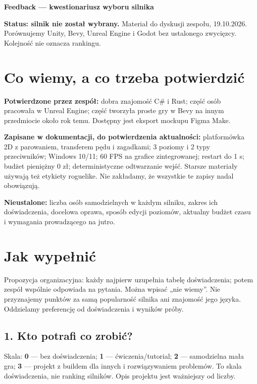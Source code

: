 \documentclass[10pt,a4paper]{article}
\begin{document}
{\Huge\bfseries Feedback — kwestionariusz wyboru silnika\par}\vspace{3mm}


\textbf{Status: silnik nie został wybrany.} Materiał do dyskusji zespołu, 19.10.2026. Porównujemy Unity, Bevy, Unreal Engine i Godot bez ustalonego zwycięzcy. Kolejność nie oznacza rankingu.



\section*{Co wiemy, a co trzeba potwierdzić}


\textbf{Potwierdzone przez zespół:} dobra znajomość C\# i Rust; część osób pracowała w Unreal Engine; część tworzyła proste gry w Bevy na innym przedmiocie około rok temu. Dostępny jest eksport mockupu Figma Make.



\textbf{Zapisane w dokumentacji, do potwierdzenia aktualności:} platformówka 2D z parowaniem, transferem pędu i zagadkami; 3 poziomy i 2 typy przeciwników; Windows 10/11; 60 FPS na grafice zintegrowanej; restart do 1 s; budżet pieniężny 0 zł; deterministyczne odtwarzanie wejść. Starsze materiały używają też etykiety roguelike. Nie zakładamy, że wszystkie te zapisy nadal obowiązują.



\textbf{Nieustalone:} liczba osób samodzielnych w każdym silniku, zakres ich doświadczenia, docelowa oprawa, sposób edycji poziomów, aktualny budżet czasu i wymagania prowadzącego na jutro.



\section*{Jak wypełnić}


Propozycja organizacyjna: każdy najpierw uzupełnia tabelę doświadczenia; potem zespół wspólnie odpowiada na pytania. Można wpisać „nie wiemy”. Nie przyznajemy punktów za samą popularność silnika ani znajomość jego języka. Oddzielamy preferencję od doświadczenia i wyników próby.



\subsection*{1. Kto potrafi co zrobić?}


Skala: \textbf{0} — bez doświadczenia; \textbf{1} — ćwiczenia/tutorial; \textbf{2} — samodzielna mała gra; \textbf{3} — projekt z buildem dla innych i rozwiązywaniem problemów. To skala doświadczenia, nie ranking silników. Opis projektu jest ważniejszy od liczby.
\end{document}
